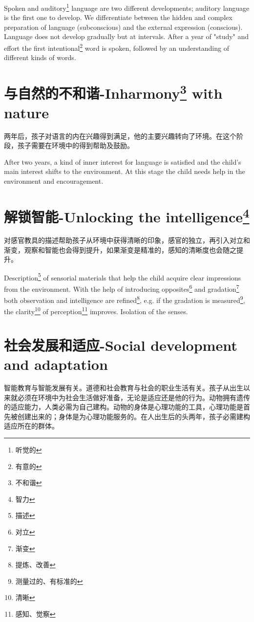 \documentclass[lang=cn,10pt]{elegantbook}
\begin{document}
Spoken and auditory\footnote{听觉的} language are two different developments; auditory language is the first one to develop. We differentiate between the hidden and complex preparation of language (subconscious) and the external expression (conscious). Language does not develop gradually but at intervals. After a year of "study" and effort the first intentional\footnote{有意的} word is spoken, followed by an understanding of different kinds of words.

\chapter{与自然的不和谐-Inharmony\footnote{不和谐} with nature}

两年后，孩子对语言的内在兴趣得到满足，他的主要兴趣转向了环境。在这个阶段，孩子需要在环境中的得到帮助及鼓励。

After two years, a kind of inner interest for language is satisfied and the child's main interest shifts to the environment. At this stage the child needs help in the environment and encouragement.

\chapter{解锁智能-Unlocking the intelligence\footnote{智力}}

对感官教具的描述帮助孩子从环境中获得清晰的印象，感官的独立，再引入对立和渐变，观察和智能也会得到提升，如果渐变是精准的，感知的清晰度也会随之提升。

Description\footnote{描述} of sensorial materials that help the child acquire clear impressions from the environment. With the help of introducing opposites\footnote{对立} and gradation\footnote{渐变} both observation and intelligence are refined\footnote{提炼、改善}, e.g. if the gradation is measured\footnote{测量过的、有标准的}, the clarity\footnote{清晰} of perception\footnote{感知、觉察} improves. Isolation of the senses.

\chapter{社会发展和适应-Social development and adaptation}

智能教育与智能发展有关。道德和社会教育与社会的职业生活有关。孩子从出生以来就必须在环境中为社会生活做好准备，无论是适应还是他的行为。动物拥有遗传的适应能力，人类必需为自己建构。动物的身体是心理功能的工具，心理功能是首先被创建出来的；身体是为心理功能服务的。在人出生后的头两年，孩子必需建构适应所在的群体。
\end{document}
